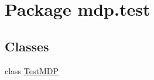 \hypertarget{namespacemdp_1_1test}{}\section{Package mdp.\+test}
\label{namespacemdp_1_1test}
\subsection*{Classes}
\begin{DoxyCompactItemize}
\item 
class \hyperlink{classmdp_1_1test_1_1_test_m_d_p}{Test\+M\+D\+P}
\end{DoxyCompactItemize}
